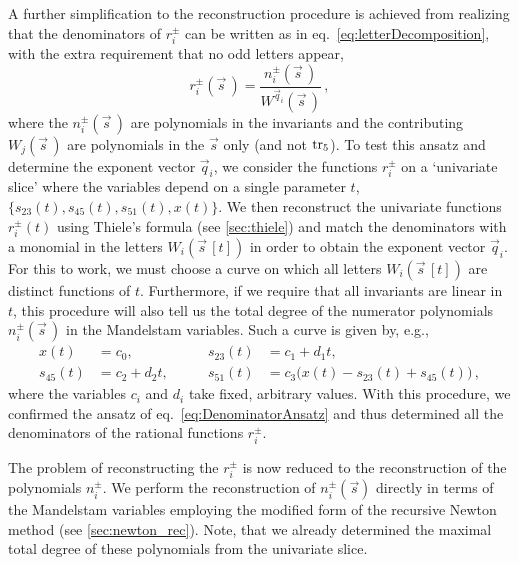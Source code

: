 A further simplification to the reconstruction procedure 
is achieved from realizing that the
denominators of $r_i^{\pm}$ can be written as in eq.~\eqref{eq:letterDecomposition},
with the extra requirement that no odd letters appear,
\begin{equation}
    r^\pm_i(\vec s\,)  = \frac{n_i^\pm(\vec s\,) }{W^{\vec q_i}(\vec s\,) }\,,
   \label{eq:DenominatorAnsatz}
\end{equation}
where the $n_i^\pm(\vec s\,)$ are polynomials in the invariants and
the contributing $W_j(\vec s\,)$ are polynomials in the $\vec s$ only (and not $\operatorname{tr_5}$). 
To test this
ansatz and determine the exponent vector $\vec q_i$, we consider the functions
$r_i^{\pm}$ on a `univariate slice' where the variables depend on a single parameter 
$t$, $\{s_{23}(t),s_{45}(t),s_{51}(t), x(t)\}$. 
We then reconstruct the univariate functions $r_i^{\pm}(t)$ using Thiele's formula (see \cref{sec:thiele}) and match the denominators 
with a monomial in the letters $W_i(\vec s\,[t])$ in order to obtain the exponent vector $\vec q_i$.
For this to work, we must choose a curve on which all 
letters $W_i(\vec s\,[t])$ are distinct functions of $t$.
Furthermore, if we require that all invariants are linear in $t$, this 
procedure will also tell us the total degree of the numerator polynomials  
$n_i^\pm(\vec s\,)$ in the Mandelstam variables. Such a curve is given by, e.g., 
\begin{equation}
  \begin{aligned}
    x(t) &= c_0, \\
    s_{45}(t) &= c_2 + d_2 t,
  \end{aligned}
  \qquad
  \begin{aligned}
    s_{23}(t) &= c_1 + d_1 t,  \\ 
    s_{51}(t) &= c_3 \big(x(t) - s_{23}(t) + s_{45}(t) \big)\,,
  \end{aligned}
\end{equation}
where the variables $c_i$ and $d_i$ take fixed, arbitrary values.
With this procedure, we confirmed the ansatz of eq.~\eqref{eq:DenominatorAnsatz}
and thus determined all the denominators of the rational functions $r_i^{\pm}$.

The problem of reconstructing the $r_i^{\pm}$ is now reduced to the
reconstruction of the polynomials $n^\pm_i$. We perform the reconstruction
of $n_i^\pm(\vec s)$ directly in terms of the Mandelstam variables
employing the modified form of the recursive Newton method (see \cref{sec:newton_rec}).
Note, that we already determined the maximal total degree of these polynomials from the univariate slice.

